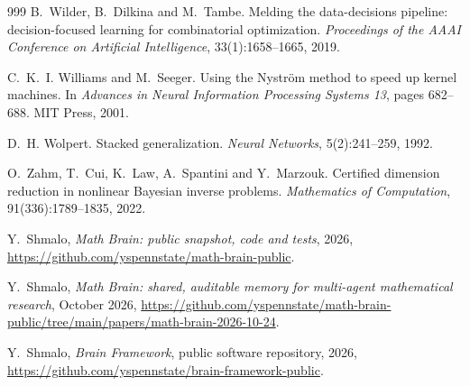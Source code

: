 \begin{thebibliography}{999}
B.~Wilder, B.~Dilkina and M.~Tambe.
\newblock Melding the data-decisions pipeline: decision-focused learning for combinatorial optimization.
\newblock \emph{Proceedings of the AAAI Conference on Artificial Intelligence}, 33(1):1658--1665, 2019.

C.~K.~I. Williams and M.~Seeger.
\newblock Using the {Nystr\"om} method to speed up kernel machines.
\newblock In \emph{Advances in Neural Information Processing Systems 13}, pages 682--688. MIT Press, 2001.

D.~H. Wolpert.
\newblock Stacked generalization.
\newblock \emph{Neural Networks}, 5(2):241--259, 1992.

O.~Zahm, T.~Cui, K.~Law, A.~Spantini and Y.~Marzouk.
\newblock Certified dimension reduction in nonlinear Bayesian inverse problems.
\newblock \emph{Mathematics of Computation}, 91(336):1789--1835, 2022.

 Y.~Shmalo, \emph{Math Brain: public snapshot, code and tests}, 2026, \url{https://github.com/yspennstate/math-brain-public}.

 Y.~Shmalo, \emph{Math Brain: shared, auditable memory for multi-agent mathematical research}, October 2026, \url{https://github.com/yspennstate/math-brain-public/tree/main/papers/math-brain-2026-10-24}.

 Y.~Shmalo, \emph{Brain Framework}, public software repository, 2026, \url{https://github.com/yspennstate/brain-framework-public}.

\end{thebibliography}
